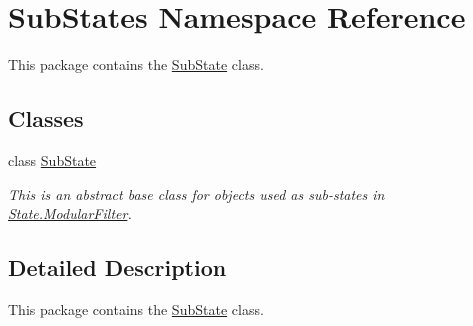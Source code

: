 \hypertarget{namespaceSubStates}{}\section{Sub\+States Namespace Reference}
\label{namespaceSubStates}


This package contains the \hyperlink{classSubStates_1_1SubState}{Sub\+State} class.  


\subsection*{Classes}
\begin{DoxyCompactItemize}
\item 
class \hyperlink{classSubStates_1_1SubState}{Sub\+State}
\begin{DoxyCompactList}\small\item\em This is an abstract base class for objects used as sub-\/states in \hyperlink{classState_1_1ModularFilter}{State.\+Modular\+Filter}. \end{DoxyCompactList}\end{DoxyCompactItemize}


\subsection{Detailed Description}
This package contains the \hyperlink{classSubStates_1_1SubState}{Sub\+State} class. 

